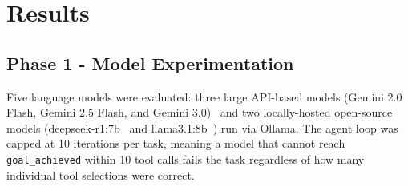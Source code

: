 \documentclass[conference]{IEEEtran}
\begin{document}
\begin{table}[t]
  \caption{MONAI segmentation inference times across hardware configurations for PANCREAS\_0001.}
  \label{tab:inference-results}
  \centering
  \small
\end{table}

\section{Results}
\label{sec:results}

\subsection{Phase 1 - Model Experimentation}

Five language models were evaluated: three large API-based models (Gemini 2.0 Flash, Gemini 2.5 Flash, and Gemini 3.0)~\cite{gemini2025} and two locally-hosted open-source models (deepseek-r1:7b~\cite{deepseekr1} and llama3.1:8b~\cite{llama31}) run via Ollama. The agent loop was capped at 10 iterations per task, meaning a model that cannot reach \texttt{goal\_achieved} within 10 tool calls fails the task regardless of how many individual tool selections were correct.
\end{document}
